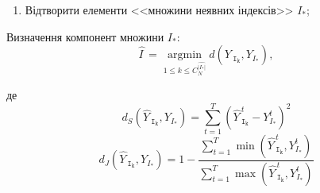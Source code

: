 \documentclass[12pt,mathserif]{beamer}
\DeclareMathOperator*{\argmin}{argmin}
\theoremstyle{plain}
\begin{document}
\begin{frame}[t]
    \frametitle{\insertsection}
    \begin{enumerate}[2]
        \item Відтворити елементи <<множини неявних індексів>> $I_*$;
    \end{enumerate}
    \vspace{1cm}

    Визначення компонент множини $I_*:$
    \begin{equation*}
        \widehat{I\,} = \argmin\limits_{1\leqslant k \leqslant C^{\widehat{|I_*|}}_N}{d\left( \widehat{Y\,}_{\mathtt{I_k}}, Y_{I_*} \right)},
    \end{equation*}

    \pause
    де
    \begin{equation*}
        d_{S}\left( \widehat{Y\,}_{\mathtt{I_k}},Y_{I_*} \right) = \sum_{t=1}^{T}\left( \widehat{Y\,}^t_{\mathtt{I_k}} - Y^t_{I_*} \right)^2
    \end{equation*}
    \begin{equation*}
        d_{J}\left( \widehat{Y\,}_{\mathtt{I_k}},Y_{I_*} \right) = 1 - \frac{\sum\limits_{t=1}^{T}\min{\left( \widehat{Y\,}^t_{\mathtt{I_k}},Y^t_{I_*} \right)}}{\sum\limits_{t=1}^{T}\max{\left( \widehat{Y\,}^t_{\mathtt{I_k}},Y^t_{I_*} \right)}}
    \end{equation*}
\end{frame}
\end{document}
